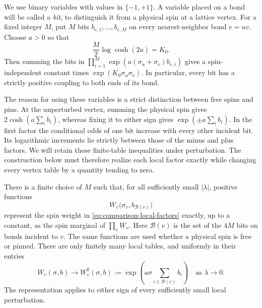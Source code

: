 We use binary variables with values in \(\{-1,+1\}\).  A variable placed
on a bond will be called a \emph{bit}, to distinguish it from a physical
spin at a lattice vertex.  For a fixed integer \(M\), put \(M\) bits
\(b_{e,1},\ldots,b_{e,M}\) on every nearest-neighbor bond \(e=uv\).
Choose \(a>0\) so that
\begin{equation}
 \frac{M}{2}\log\cosh(2a)=K_0.
 \label{eq:comparison-bit-coupling}
\end{equation}
Then summing the bits in
\(\prod_{i=1}^M\exp(a(\sigma_u+\sigma_v)b_{e,i})\)
gives a spin-independent constant times
\(\exp(K_0\sigma_u\sigma_v)\).  In particular, every bit has a strictly
positive coupling to both ends of its bond.

The reason for using these variables is a strict distinction between
free spins and pins.  At the unperturbed vertex, summing the physical
spin gives $2\cosh(a\sum_i b_i)$, whereas fixing it to either sign
gives $\exp(\pm a\sum_i b_i)$.  In the first factor the conditional
odds of one bit increase with every other incident bit.  Its logarithmic
increments lie strictly between those of the minus and plus factors.
We will retain these finite-table inequalities under perturbation.
The construction below must therefore realize each local factor exactly
while changing every vertex table by a quantity tending to zero.

\begin{proposition}
\label{prop:bit-representation}
There is a finite choice of \(M\) such that, for all sufficiently small
\(\lvert\lambda\rvert\), positive functions
\[
 W_v\bigl(\sigma_v,b_{\mathcal B(v)}\bigr)
\]
represent the spin weight in \eqref{eq:comparison-local-factors} exactly,
up to a constant, as the spin marginal of \(\prod_v W_v\).
Here \(\mathcal B(v)\) is the set of the \(4M\) bits on bonds incident to
\(v\).  The same functions are used whether a physical spin is free or
pinned.  There are only finitely many local tables, and uniformly in
their entries
\begin{equation}
 W_v(\sigma,b)\longrightarrow
 W_v^0(\sigma,b):=\exp\left(a\sigma\sum_{i\in\mathcal B(v)}b_i\right)
 \quad\text{as }\lambda\longrightarrow0.
 \label{eq:comparison-table-limit}
\end{equation}
The representation applies to either sign of every sufficiently small
local perturbation.
\end{proposition}

